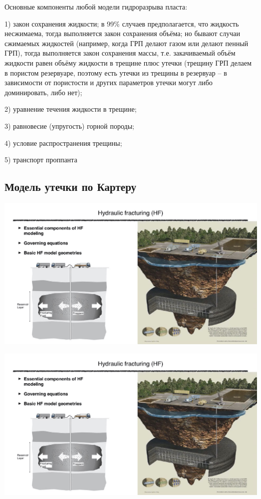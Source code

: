 \documentclass[main.tex]{subfiles}
\begin{document}
Основные компоненты любой модели гидроразрыва пласта:

1) закон сохранения жидкости; в 99\% случаев предполагается, что жидкость несжимаема, тогда выполняется закон сохранения объёма; но бывают случаи сжимаемых жидкостей (например, когда ГРП делают газом или делают пенный ГРП), тогда выполняется закон сохранения массы, т.е. закачиваемый объём жидкости равен объёму жидкости в трещине плюс утечки (трещину ГРП делаем в пористом резервуаре, поэтому есть утечки из трещины в резервуар -- в зависимости от пористости и других параметров утечки могут либо доминировать, либо нет);

2) уравнение течения жидкости в трещине; 

3) равновесие (упругость) горной породы;

4) условие распространения трещины;

5) транспорт проппанта

\subsection{Модель утечки по Картеру}

\includegraphics[width=\textwidth, page=3]{HF_slides.pdf}

\includegraphics[width=\textwidth, page=4]{HF_slides.pdf}
\end{document}
